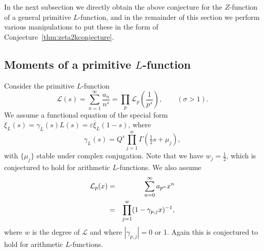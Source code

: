 \documentclass[12pt,letterpaper]{amsart}
\theoremstyle{plain}
\theoremstyle{definition}
\theoremstyle{remark}
\numberwithin{equation}{subsection}
\numberwithin{theorem}{subsection}
\numberwithin{table}{subsection}
\begin{document}
In the next subsection we directly obtain the above conjecture for 
the $Z$-function of a general primitive
$L$-function, and in the remainder of this section we perform various manipulations to 
put these in the form
of Conjecture~\ref{thm:zeta2kconjecture}.


\subsection{  Moments of a primitive $L$-function
}\label{sec:Lmeanvalues}

Consider the primitive $L$-function
\begin{equation}\mathcal{L}(s)=\sum_{n=1}^\infty \frac{a_n}{n^s}=
\prod_p \mathcal{L}_p\left(\frac1{p^s}\right), \qquad (\sigma>1) .
\end{equation}
  We assume a functional equation of the special form 
$\xi_L(s)=\gamma_L(s)L(s)=\varepsilon \overline{\xi}_L(1-s)$, where
\begin{equation}
\gamma_L(s)= Q^s \prod_{j=1}^w \Gamma(\tfrac12 s+ \mu_j) ,
\end{equation}
with $\{\mu_j\}$ stable under complex conjugation.
Note that we have $w_j=\frac12$, which is conjectured to hold for 
arithmetic $L$-functions.
We also assume
\begin{eqnarray}\mathcal{L}_p(x)&=&\sum_{n=0}^\infty a_{p^n}x^n \cr
&=&\prod_{j=1}^w (1-\gamma_{p,j} x)^{-1},
\end{eqnarray}
where $w$ is the degree of $\mathcal{L}$ and where
$|\gamma_{p,j}|=0$ or 1.  Again this is conjectured to hold for
arithmetic $L$-functions. 
\end{document}
